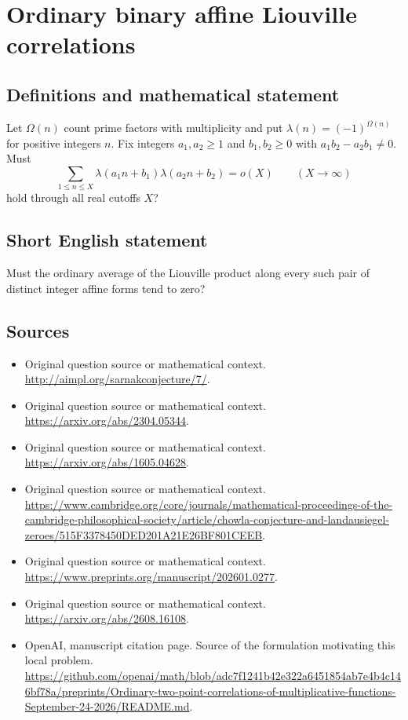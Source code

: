 \documentclass[11pt]{article}
\begin{document}
\section*{Ordinary binary affine Liouville correlations}\label{30007270}
\subsection{Definitions and mathematical statement}
Let $\Omega(n)$ count prime factors with multiplicity and put $\lambda(n)=(-1)^{\Omega(n)}$ for positive integers $n$. Fix integers $a_1,a_2\ge1$ and $b_1,b_2\ge0$ with $a_1b_2-a_2b_1\ne0$. Must
\[
 \sum_{1\le n\le X}\lambda(a_1n+b_1)\lambda(a_2n+b_2)=o(X)
 \qquad(X\to\infty)
\]
hold through all real cutoffs $X$?
\subsection{Short English statement}
Must the ordinary average of the Liouville product along every such pair of distinct integer affine forms tend to zero?
\subsection{Sources}
\begin{itemize}
\item[S1] Original question source or mathematical context.
\url{http://aimpl.org/sarnakconjecture/7/}.
\item[S2] Original question source or mathematical context.
\url{https://arxiv.org/abs/2304.05344}.
\item[S3] Original question source or mathematical context.
\url{https://arxiv.org/abs/1605.04628}.
\item[S4] Original question source or mathematical context.
\url{https://www.cambridge.org/core/journals/mathematical-proceedings-of-the-cambridge-philosophical-society/article/chowla-conjecture-and-landausiegel-zeroes/515F3378450DED201A21E26BF801CEEB}.
\item[S5] Original question source or mathematical context.
\url{https://www.preprints.org/manuscript/202601.0277}.
\item[S6] Original question source or mathematical context.
\url{https://arxiv.org/abs/2608.16108}.
\item[S7] OpenAI, manuscript citation page. Source of the formulation motivating this local problem.
\url{https://github.com/openai/math/blob/adc7f1241b42e322a6451854ab7e4b4c146bf78a/preprints/Ordinary-two-point-correlations-of-multiplicative-functions-September-24-2026/README.md}.
\end{itemize}
\end{document}
